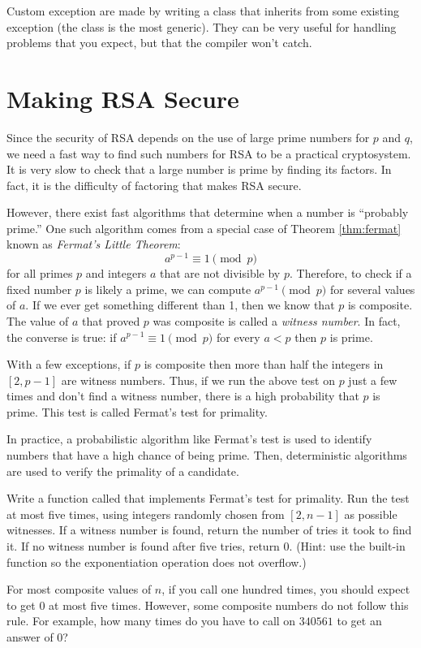 \begin{info}
Custom exception are made by writing a class that inherits from some existing exception (the  class is the most generic).
They can be very useful for handling problems that you expect, but that the compiler won't catch.
\end{info}

\section*{Making RSA Secure}

Since the security of RSA depends on the use of large prime numbers for $p$ and $q$, we need a fast way to find such numbers for RSA to be a practical cryptosystem.
It is very slow to check that a large number is prime by finding its factors.
In fact, it is the difficulty of factoring that makes RSA secure.

However, there exist fast algorithms that determine when a number is ``probably prime.''
One such algorithm comes from a special case of Theorem \ref{thm:fermat} known as \emph{Fermat's Little Theorem}:
\[
a^{p-1} \equiv 1 \pmod{p}
\]
for all primes $p$ and integers $a$ that are not divisible by $p$.
Therefore, to check if a fixed number $p$ is likely a prime, we can compute $a^{p-1} \pmod{p}$ for several values of $a$.
If we ever get something different than 1, then we know that $p$ is composite.
The value of $a$ that proved $p$ was composite is called a \emph{witness number}.
In fact, the converse is true: if $a^{p-1} \equiv 1 \pmod{p}$ for every $a<p$ then $p$ is prime.

With a few exceptions, if $p$ is composite then more than half the integers in $[2, p-1]$ are witness numbers.
Thus, if we run the above test on $p$ just a few times and don't find a witness number, there is a high probability that $p$ is prime.
This test is called Fermat's test for primality.

In practice, a probabilistic algorithm like Fermat's test is used to identify numbers that have a high chance of being prime. 
Then, deterministic algorithms are used to verify the primality of a candidate.

\begin{problem}
Write a function called  that implements Fermat's test for primality.
Run the test at most five times, using integers randomly chosen from $[2, n-1]$ as possible witnesses.
If a witness number is found, return the number of tries it took to find it.
If no witness number is found after five tries, return $0$.
(Hint: use the built-in  function so the exponentiation operation does not overflow.)

For most composite values of $n$, if you call  one hundred times, you should expect to get $0$ at most five times.
However, some composite numbers do not follow this rule. 
For example, how many times do you have to call  on $340561$ to get an answer of $0$?
\label{prob:prime_confidence}
\end{problem}

